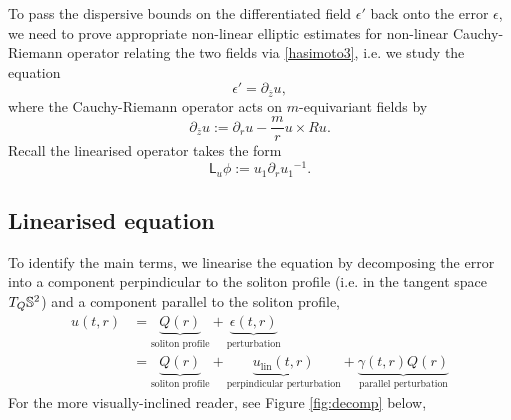 


To pass the dispersive bounds on the differentiated field $\epsilon'$ back onto the error $\epsilon$, we need to prove appropriate non-linear elliptic estimates for non-linear Cauchy-Riemann operator relating the two fields via \eqref{hasimoto3}, i.e. we study the equation 
    \begin{equation}\label{eq:CR3}
        \epsilon' 
            =\partial_{\overline z} u ,
    \end{equation}
where the Cauchy-Riemann operator acts on $m$-equivariant fields by 
    \[
        \partial_{\overline z} u 
            := \partial_r u - \frac{m}{r} u \times Ru.
    \]
Recall the linearised operator takes the form   
    \[
        \mathsf L_u \phi 
            :=  u_1 \partial_r {u_1}^{-1}.
    \]

\subsection{Linearised equation}

To identify the main terms, we linearise the equation by decomposing the error into a component perpindicular to the soliton profile (i.e. in the tangent space $T_Q \mathbb S^2$) and a component parallel to the soliton profile, 
\begin{equation}\label{eq:perpparallel}
    \begin{split}
        u(t, r) 
            &=  \underbrace{Q(r)}_{\text{soliton profile}} + \underbrace{\epsilon(t, r)}_{\text{perturbation}} \\
            &= \underbrace{Q(r)}_{\text{soliton profile}} + \underbrace{u_{\mathrm{lin}} (t, r)}_{\text{perpindicular perturbation}} + \underbrace{\gamma(t, r) Q(r)}_{\text{parallel perturbation}}
    \end{split}
\end{equation}
For the more visually-inclined reader, see Figure \ref{fig:decomp} below, 

